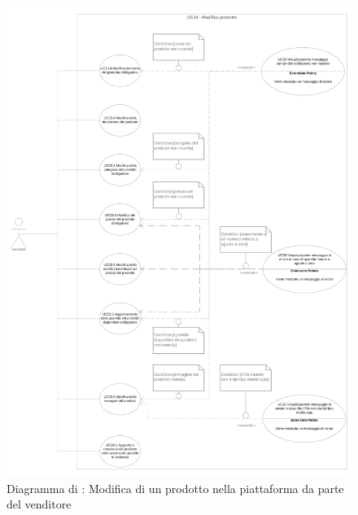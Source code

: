 \begin{figure}[H]
    \centering
    \includegraphics[scale=0.1]{Immagini/DiagrammiUC/UC19ModificaProdotto.png}
    \caption{Diagramma di \actualUC: Modifica di un prodotto nella piattaforma da parte del venditore}
    \label{fig:ModificaProdotto}
\end{figure}

